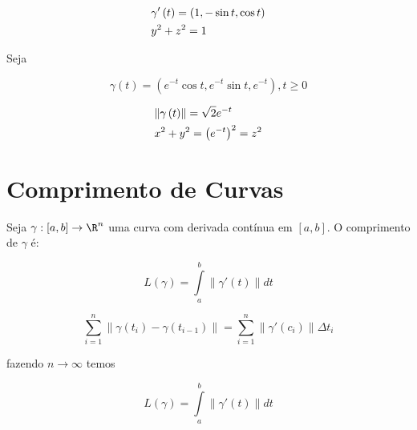 \documentclass[11pt, oneside, a4paper]{gsm-l}
\begin{document}
\begin{sol}
\[
\begin{gathered}
\gamma '\left( t \right) = \left( {1, - \sin t,\cos t} \right) \hfill \\
y^2  + z^2  = 1 \hfill \\
\end{gathered}
\]

\end{sol}

\newpage 

\begin{exem}
Seja

\[
    \gamma \left( t \right) = \left( {e^{ - t} \cos t,e^{ - t} \sin t,e^{ - t} } \right),t \geqslant 0
\]

\end{exem}

\begin{sol}
\[
\begin{gathered}
\left\| {\gamma \left( t \right)} \right\| = \sqrt 2 e^{ - t}  \hfill \\
x^2  + y^2  = \left( {e^{ - t} } \right)^2  = z^2  \hfill \\
\end{gathered}
\]

\end{sol}

\section{Comprimento de Curvas} \label{sec08}

\begin{defi}
    Seja $\gamma :\left[ {a,b} \right] \to \R^n$ uma curva com derivada contínua em $\left[ {a,b} \right]$. O comprimento de $\gamma$ é:

\[\boxed{
    L\left( \gamma  \right) = \int\limits_a^b {\left\| {\gamma '\left( t \right)} \right\|dt}}
\]
\end{defi}


\begin{dem}
\[
    \sum\limits_{i = 1}^n {\left\| {\gamma \left( {t_i } \right) - \gamma \left( {t_{i - 1} } \right)} \right\|}  = \sum\limits_{i = 1}^n {\left\| {\gamma '\left( {c_i } \right)} \right\|\Delta t_i }
\]

fazendo $n \to \infty$ temos

\[
    L\left( \gamma  \right) = \int\limits_a^b {\left\| {\gamma '\left( t \right)} \right\|dt}
\]

\end{dem}
\end{document}
